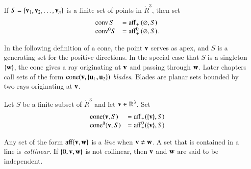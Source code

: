 \begin{definition}  If $S = \{{\mathbf v}_1,{\mathbf v}_2,\ldots,{\mathbf v}_n\}$ is a finite set
of points in $\ring{R}^3$, then
set
	$$
        \begin{array}{lll}
          {\operatorname{conv}}\, S &= {\operatorname{aff}}_+\, (\varnothing,S)\\
	   {\operatorname{conv}}^0 S &= {\operatorname{aff}}^0_+\, (\varnothing,S).\\
           \end{array}
        $$
%
%
%
\end{definition}

In the following definition of a cone, the point ${\mathbf v}$ serves
as apex, and $S$ is a generating set for the positive directions.
In the special case that $S$ is a singleton $\{{\mathbf w}\}$, 
the cone gives
a ray originating at ${\mathbf v}$ and passing through ${\mathbf w}$.  Later
chapters call sets of the form ${\operatorname{cone}}({\mathbf v},\{{\mathbf u}_1,{\mathbf u}_2\})$ {\it blades}.
Blades are planar sets bounded by two rays originating at ${\mathbf v}$.
%
%
%

\begin{definition}[cone]
Let $S$ be a finite subset of
$\ring{R}^3$ and let ${\mathbf v}\in\mathbb{R}^3$. Set
  $$\begin{array}{lll}
  {\operatorname{cone}}({\mathbf v},S) &= {\operatorname{aff}}_+(\{{\mathbf v}\},S)\\
  {\operatorname{cone}}^0({\mathbf v},S) &= {\operatorname{aff}}^0_+(\{{\mathbf v}\},S)\\
  \end{array}
  $$
%
%
%
\end{definition}




	
\begin{definition}	
Any set of the form ${\operatorname{aff}}\{{\mathbf v},{\mathbf w}\}$ is a {\it line} when ${\mathbf v}\ne {\mathbf w}$.  A set that is contained in a line is {\it collinear}.  If $\{0,{\mathbf v},{\mathbf w}\}$ is not collinear, then ${\mathbf v}$ and ${\mathbf w}$ are said to be independent.
\end{definition}
%
%

